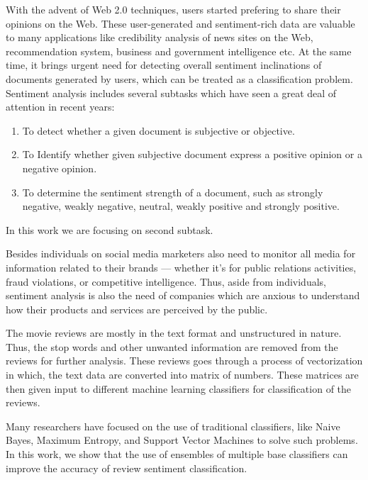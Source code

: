 \documentclass[10pt]{article}
\begin{document}
{\par With the advent of Web 2.0 techniques,
users started prefering to share their opinions on the Web. These user-generated and 
sentiment-rich data are valuable to many applications like 
credibility analysis of news sites on the Web, recommendation system, business and 
government intelligence etc. At the same time, it brings
urgent need for detecting overall sentiment inclinations of
documents generated by users, which can be treated as a
classification problem. Sentiment analysis includes several
subtasks  which have seen a great deal of attention in recent years:
\begin{enumerate}
 \item To detect whether a given document is subjective or objective.
  \item To Identify whether given subjective document express a positive opinion or a negative opinion.
  \item To determine the sentiment strength of a document,
such as strongly negative, weakly negative, neutral, weakly
positive and strongly positive.
\end{enumerate}

In this work we are focusing on second subtask.

\par Besides individuals on social media marketers also need to monitor all media for information related to their brands —
whether it’s for public relations activities, fraud violations, or competitive intelligence.
Thus, aside from individuals, sentiment analysis is also the need of companies which are anxious to understand how
their products and services are perceived by the public.
\par The movie reviews are mostly in the text format and unstructured 
in nature. Thus, the stop words and other unwanted information are 
removed from the reviews for further analysis. These
reviews goes through a process of vectorization in which, the text
data are converted into matrix of numbers. These matrices are
then given input to different machine learning classifiers for 
classification of the reviews.
\par Many researchers have focused on the use of traditional classifiers,
like Naive Bayes, Maximum Entropy, and Support Vector Machines to
solve such problems. In this work, we show that the use of ensembles
of multiple base classifiers can improve the accuracy of review sentiment classification.

\newpage
\begin{center}


\end{center}}
\end{document}
